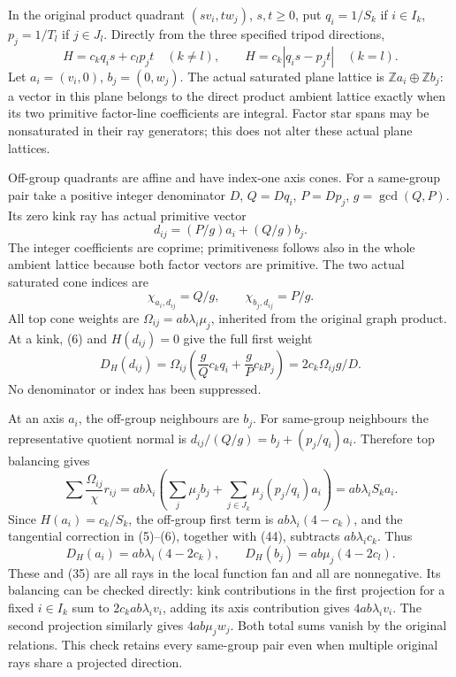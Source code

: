 \documentclass[
  11pt,
]{article}
\begin{document}
In the original product quadrant \((s v_i,t w_j)\), \(s,t\geq0\), put
\(q_i=1/S_k\) if \(i\in I_k\), \(p_j=1/T_l\) if \(j\in J_l\). Directly
from the three specified tripod directions, \[
 H=c_kq_i s+c_lp_j t\quad(k\ne l),\qquad
 H=c_k|q_i s-p_jt|\quad(k=l).                              \tag{40}
\] Let \(a_i=(v_i,0)\), \(b_j=(0,w_j)\). The actual saturated plane
lattice is \(\mathbb{Z}a_i\oplus\mathbb{Z}b_j\): a vector in this plane
belongs to the direct product ambient lattice exactly when its two
primitive factor-line coefficients are integral. Factor star spans may
be nonsaturated in their ray generators; this does not alter these
actual plane lattices.

Off-group quadrants are affine and have index-one axis cones. For a
same-group pair take a positive integer denominator \(D\), \(Q=Dq_i\),
\(P=Dp_j\), \(g=\gcd(Q,P)\). Its zero kink ray has actual primitive
vector \[
                            d_{ij}=(P/g)a_i+(Q/g)b_j.        \tag{41}
\] The integer coefficients are coprime; primitiveness follows also in
the whole ambient lattice because both factor vectors are primitive. The
two actual saturated cone indices are \[
                    \chi_{a_i,d_{ij}}=Q/g,\qquad
                    \chi_{b_j,d_{ij}}=P/g.                 \tag{42}
\] All top cone weights are \(\Omega_{ij}=ab\lambda_i\mu_j\), inherited
from the original graph product. At a kink, (6) and \(H(d_{ij})=0\) give
the full first weight \[
 D_H(d_{ij})=\Omega_{ij}\left(\frac gQ c_kq_i+\frac gP c_kp_j\right)
                             =2c_k\Omega_{ij}g/D.           \tag{43}
\] No denominator or index has been suppressed.

At an axis \(a_i\), the off-group neighbours are \(b_j\). For same-group
neighbours the representative quotient normal is
\(d_{ij}/(Q/g)=b_j+(p_j/q_i)a_i\). Therefore top balancing gives \[
 \sum\frac{\Omega_{ij}}{\chi}r_{ij}
       =ab\lambda_i\left(\sum_j\mu_jb_j+
                    \sum_{j\in J_k}\mu_j(p_j/q_i)a_i\right)
       =ab\lambda_i S_k a_i.                               \tag{44}
\] Since \(H(a_i)=c_k/S_k\), the off-group first term is
\(ab\lambda_i(4-c_k)\), and the tangential correction in (5)--(6), together with (44), subtracts
\(ab\lambda_i c_k\). Thus \[
 D_H(a_i)=ab\lambda_i(4-2c_k),\qquad
 D_H(b_j)=ab\mu_j(4-2c_l).                                 \tag{45}
\] These and (35) are all rays in the local function fan and all are
nonnegative. Its balancing can be checked directly: kink contributions
in the first projection for a fixed \(i\in I_k\) sum to
\(2c_kab\lambda_i v_i\), adding its axis contribution gives
\(4ab\lambda_i v_i\). The second projection similarly gives
\(4ab\mu_jw_j\). Both total sums vanish by the original relations. This
check retains every same-group pair even when multiple original rays
share a projected direction.
\end{document}
